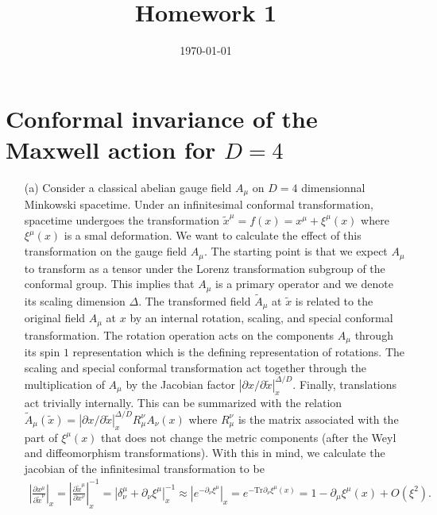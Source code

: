 \documentclass[10pt, a4paper]{article}
\title{Homework 1} %
\author{\PA} %
\date{\today} %
\begin{document}
\maketitlepage

\maketableofcontents


\footnotesize{

\section{Conformal invariance of the Maxwell action for $D=4$}

\begin{enumerate}
  \item[(a)] Consider a classical abelian gauge field $A_\mu$ on $D=4$ dimensionnal Minkowski spacetime. Under an infinitesimal conformal transformation, spacetime undergoes the transformation $\tilde{x}^{\mu} = f(x) = x^{\mu} + \xi^{\mu}(x)$ where $\xi^\mu(x)$ is a smal deformation. We want to calculate the effect of this transformation on the gauge field $A_\mu$. The starting point is that we expect $A_\mu$ to transform as a tensor under the Lorenz transformation subgroup of the conformal group. This implies that $A_\mu$ is a primary operator and we denote its scaling dimension $\Delta$. The transformed field $\tilde{A}_\mu$ at $\tilde{x}$ is related to the original field $A_\mu$ at $x$ by an internal rotation, scaling, and special conformal transformation. The rotation operation acts on the components $A_\mu$ through its spin $1$ representation which is the defining representation of rotations. The scaling and special conformal transformation act together through the multiplication of $A_\mu$ by the Jacobian factor $|\partial x/\partial \tilde{x}|_{x}^{\Delta/D}$. Finally, translations act trivially internally. This can be summarized with the relation $\tilde{A}_\mu(\tilde x) = |\partial x/\partial \tilde{x}|_{x}^{\Delta/D} R_{\mu}^{\nu} A_{\nu}(x)$ where $R_{\mu}^{\nu}$ is the matrix associated with the part of $\xi^\mu(x)$ that does not change the metric components (after the Weyl and diffeomorphism transformations). With this in mind, we calculate the jacobian of the infinitesimal transformation to be 
  \begin{align*}
    \left|\frac{\partial x^\mu }{\partial \tilde{x}^\nu}\right|_{x} = \left|\frac{\partial \tilde{x}^\mu }{\partial x^\nu}\right|_{x}^{-1} = |\delta_\nu^\mu + \partial_\nu \xi^\mu|_{x}^{-1} \approx |e^{-\partial_\nu \xi^\mu}|_{x} = e^{-\text{Tr} \partial_\nu \xi^\mu(x)} = 1- \partial_\mu \xi^\mu(x) + O(\xi^2). 
  \end{align*}

\end{enumerate}}
\end{document}
